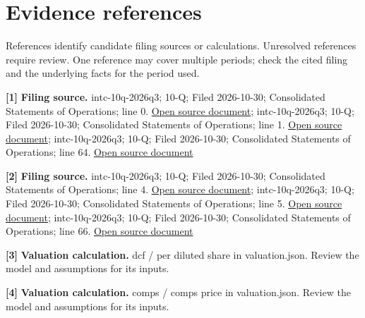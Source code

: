 \documentclass[11pt,a4paper]{article}
\begin{document}
\section*{Evidence references}
{\sffamily\small\color{muted} References identify candidate filing sources or calculations. Unresolved references require review. One reference may cover multiple periods; check the cited filing and the underlying facts for the period used.}\par
\small\setlength{\parskip}{7pt}
\noindent\textbf{[1]} \textbf{Filing source.} intc-10q-2026q3; 10-Q; Filed 2026-10-30; Consolidated Statements of Operations; line 0. \href{https://www.sec.gov/Archives/edgar/data/50863/000005086326000191/intc-20260926.htm}{Open source document}; intc-10q-2026q3; 10-Q; Filed 2026-10-30; Consolidated Statements of Operations; line 1. \href{https://www.sec.gov/Archives/edgar/data/50863/000005086326000191/intc-20260926.htm}{Open source document}; intc-10q-2026q3; 10-Q; Filed 2026-10-30; Consolidated Statements of Operations; line 64. \href{https://www.sec.gov/Archives/edgar/data/50863/000005086326000191/intc-20260926.htm}{Open source document}\par
\noindent\textbf{[2]} \textbf{Filing source.} intc-10q-2026q3; 10-Q; Filed 2026-10-30; Consolidated Statements of Operations; line 4. \href{https://www.sec.gov/Archives/edgar/data/50863/000005086326000191/intc-20260926.htm}{Open source document}; intc-10q-2026q3; 10-Q; Filed 2026-10-30; Consolidated Statements of Operations; line 5. \href{https://www.sec.gov/Archives/edgar/data/50863/000005086326000191/intc-20260926.htm}{Open source document}; intc-10q-2026q3; 10-Q; Filed 2026-10-30; Consolidated Statements of Operations; line 66. \href{https://www.sec.gov/Archives/edgar/data/50863/000005086326000191/intc-20260926.htm}{Open source document}\par
\noindent\textbf{[3]} \textbf{Valuation calculation.} dcf / per diluted share in valuation.json. Review the model and assumptions for its inputs.\par
\noindent\textbf{[4]} \textbf{Valuation calculation.} comps / comps price in valuation.json. Review the model and assumptions for its inputs.\par
{}
\end{document}
